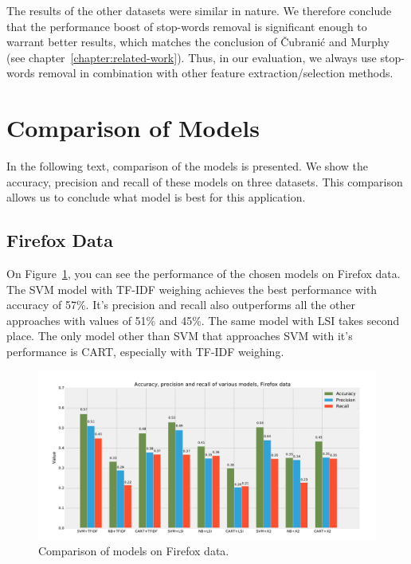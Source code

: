 The results of the other datasets were similar in nature. We therefore conclude that the performance boost of stop-words removal is significant enough to warrant better results, which matches the conclusion of Čubranić and Murphy~\cite{Murphy} (see chapter~\ref{chapter:related-work}). Thus, in our evaluation, we always use stop-words removal in combination with other feature extraction/selection methods.

\section{Comparison of Models}

In the following text, comparison of the models is presented. We show the accuracy, precision and recall of these models on three datasets. This comparison allows us to conclude what model is best for this application.

\subsection{Firefox Data}

On Figure~\ref{fig:results.models.firefox}, you can see the performance of the chosen models on Firefox data. The SVM model with TF-IDF weighing achieves the best performance with accuracy of 57\%. It's precision and recall also outperforms all the other approaches with values of 51\% and 45\%. The same model with LSI takes second place. The only model other than SVM that approaches SVM with it's performance is CART, especially with TF-IDF weighing.

\begin{figure}[htbp]
    \centering
        \includegraphics[width=\textwidth]{./images/comparison_of_models/firefox.pdf}
    \caption{Comparison of models on Firefox data.}
    \label{fig:results.models.firefox}
\end{figure}

